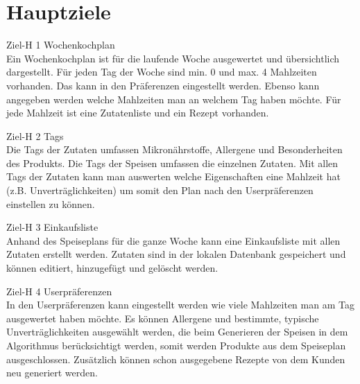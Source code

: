 \section{Hauptziele}
\begin{description}
\item Ziel-H 1      Wochenkochplan\\
Ein Wochenkochplan ist für die laufende Woche ausgewertet und übersichtlich dargestellt. Für jeden Tag der Woche sind min. 0 und max. 4 Mahlzeiten vorhanden. Das kann in den Präferenzen eingestellt werden. Ebenso kann angegeben werden welche Mahlzeiten man an welchem Tag haben möchte. Für jede Mahlzeit ist eine Zutatenliste und ein Rezept vorhanden.  

\item Ziel-H 2      Tags\\
Die Tags der Zutaten umfassen Mikronährstoffe, Allergene und Besonderheiten des Produkts. Die Tags der Speisen umfassen die einzelnen Zutaten. Mit allen Tags der Zutaten kann man auswerten welche Eigenschaften eine Mahlzeit hat (z.B. Unverträglichkeiten) um somit den Plan nach den Userpräferenzen einstellen zu können. 

\item Ziel-H 3      Einkaufsliste\\
Anhand des Speiseplans für die ganze Woche kann eine Einkaufsliste mit allen Zutaten erstellt werden. Zutaten sind in der lokalen Datenbank gespeichert und können editiert, hinzugefügt und gelöscht werden.  

\item Ziel-H 4      Userpräferenzen\\
In den Userpräferenzen kann eingestellt werden wie viele Mahlzeiten man am Tag ausgewertet haben möchte. Es können Allergene und bestimmte, typische Unverträglichkeiten ausgewählt werden, die beim Generieren der Speisen in dem Algorithmus berücksichtigt werden, somit werden Produkte aus dem Speiseplan ausgeschlossen. Zusätzlich können schon ausgegebene Rezepte von dem Kunden neu generiert werden.


\end{description}
